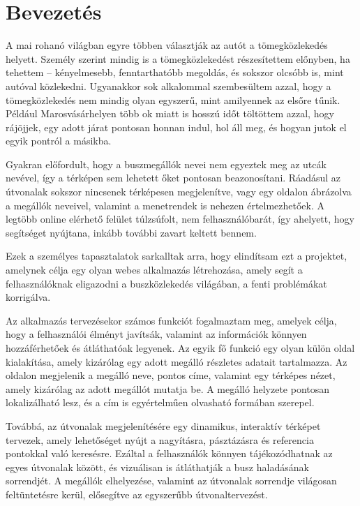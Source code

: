 \section{Bevezetés}

\indent A mai rohanó világban egyre többen választják az autót a tömegközlekedés helyett. Személy szerint mindig is a tömegközlekedést részesítettem előnyben, ha tehettem – kényelmesebb, fenntarthatóbb megoldás, és sokszor olcsóbb is, mint autóval közlekedni. Ugyanakkor sok alkalommal szembesültem azzal, hogy a tömegközlekedés nem mindig olyan egyszerű, mint amilyennek az elsőre tűnik. Például Marosvásárhelyen több ok miatt is hosszú időt töltöttem azzal, hogy rájöjjek, egy adott járat pontosan honnan indul, hol áll meg, és hogyan jutok el egyik pontról a másikba.

Gyakran előfordult, hogy a buszmegállók nevei nem egyeztek meg az utcák nevével, így a térképen sem lehetett őket pontosan beazonosítani. Ráadásul az útvonalak sokszor nincsenek térképesen megjelenítve, vagy egy oldalon ábrázolva a megállók neveivel, valamint a menetrendek is nehezen értelmezhetőek. A legtöbb online elérhető felület túlzsúfolt, nem felhasználóbarát, így ahelyett, hogy segítséget nyújtana, inkább további zavart keltett bennem.

Ezek a személyes tapasztalatok sarkalltak arra, hogy elindítsam ezt a projektet, amelynek célja egy olyan webes alkalmazás létrehozása, amely segít a felhasználóknak eligazodni a buszközlekedés világában, a fenti problémákat korrigálva.

\indent Az alkalmazás tervezésekor számos funkciót fogalmaztam meg, amelyek célja, hogy a felhasználói élményt javítsák, valamint az információk könnyen hozzáférhetőek és átláthatóak legyenek. Az egyik fő funkció egy olyan külön oldal kialakítása, amely kizárólag egy adott megálló részletes adatait tartalmazza. Az oldalon megjelenik a megálló neve, pontos címe, valamint egy térképes nézet, amely kizárólag az adott megállót mutatja be. A megálló helyzete pontosan lokalizálható lesz, és a cím is egyértelműen olvasható formában szerepel.

Továbbá, az útvonalak megjelenítésére egy dinamikus, interaktív térképet tervezek, amely lehetőséget nyújt a nagyításra, pásztázásra és referencia pontokkal való keresésre. Ezáltal a felhasználók könnyen tájékozódhatnak az egyes útvonalak között, és vizuálisan is átláthatják a busz haladásának sorrendjét. A megállók elhelyezése, valamint az útvonalak sorrendje világosan feltüntetésre kerül, elősegítve az egyszerűbb útvonaltervezést.

